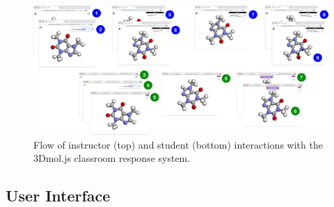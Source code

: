 \documentclass[journal=jceda8,manuscript=article]{achemso}
\begin{document}
\begin{figure}
    \centering
    \includegraphics[width=\linewidth]{flow}
    \caption{Flow of instructor (top) and student (bottom) interactions with the 3Dmol.js classroom response system.}
    \label{fig:flow}
\end{figure}

\subsection{User Interface}
\end{document}
